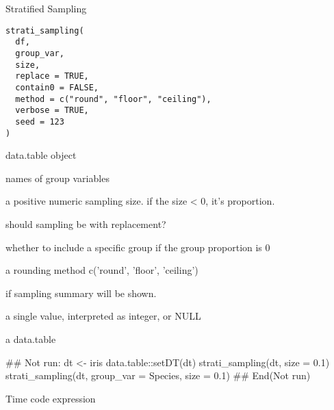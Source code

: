 \documentclass[letterpaper]{book}
\begin{document}
%
\begin{Description}
Stratified Sampling
\end{Description}
%
\begin{Usage}
\begin{verbatim}
strati_sampling(
  df,
  group_var,
  size,
  replace = TRUE,
  contain0 = FALSE,
  method = c("round", "floor", "ceiling"),
  verbose = TRUE,
  seed = 123
)
\end{verbatim}
\end{Usage}
%
\begin{Arguments}
\begin{ldescription}
\item[\code{df}] data.table object

\item[\code{group\_var}] names of group variables

\item[\code{size}] a positive numeric sampling size. if the size < 0, it's proportion.

\item[\code{replace}] should sampling be with replacement?

\item[\code{contain0}] whether to include a specific group if the group proportion is 0

\item[\code{method}] a rounding method c('round', 'floor', 'ceiling')

\item[\code{verbose}] if sampling summary will be shown.

\item[\code{seed}] a single value, interpreted as integer, or NULL
\end{ldescription}
\end{Arguments}
%
\begin{Value}
a data.table
\end{Value}
%
\begin{Examples}
\begin{ExampleCode}
## Not run: 
dt <- iris
data.table::setDT(dt)
strati_sampling(dt, size = 0.1)
strati_sampling(dt, group_var = Species, size = 0.1)
## End(Not run)

\end{ExampleCode}
\end{Examples}
%
\begin{Description}
Time \R{} code expression
\end{Description}
\end{document}
